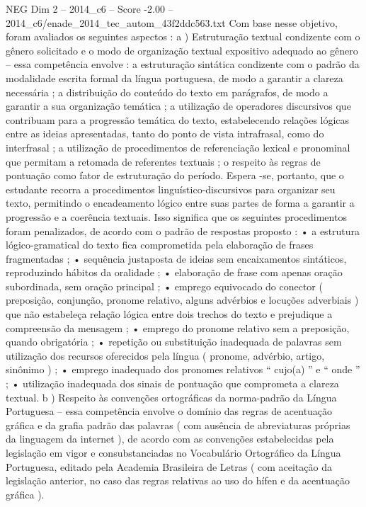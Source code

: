 \begin{textsample}{NEG Dim 2 – 2014\_c6 – Score -2.00 – 2014\_c6/enade\_2014\_tec\_autom\_43f2ddc563.txt}
Com base nesse objetivo, foram avaliados os seguintes aspectos : a ) Estruturação textual condizente com o gênero solicitado e o modo de organização textual expositivo adequado ao gênero – essa competência envolve : a estruturação sintática condizente com o padrão da modalidade escrita formal da língua portuguesa, de modo a garantir a clareza necessária ; a distribuição do conteúdo do texto em parágrafos, de modo a garantir a sua organização temática ; a utilização de operadores discursivos que contribuam para a progressão temática do texto, estabelecendo relações lógicas entre as ideias apresentadas, tanto do ponto de vista intrafrasal, como do interfrasal ; a utilização de procedimentos de referenciação lexical e pronominal que permitam a retomada de referentes textuais ; o respeito às regras de pontuação como fator de estruturação do período.
Espera -se, portanto, que o estudante recorra a procedimentos linguístico-discursivos para organizar seu texto, permitindo o encadeamento lógico entre suas partes de forma a garantir a progressão e a coerência textuais.
Isso significa que os seguintes procedimentos foram penalizados, de acordo com o padrão de respostas proposto : • a estrutura lógico-gramatical do texto fica comprometida pela elaboração de frases fragmentadas ; • sequência justaposta de ideias sem encaixamentos sintáticos, reproduzindo hábitos da oralidade ; • elaboração de frase com apenas oração subordinada, sem oração principal ; • emprego equivocado do conector ( preposição, conjunção, pronome relativo, alguns advérbios e locuções adverbiais ) que não estabeleça relação lógica entre dois trechos do texto e prejudique a compreensão da mensagem ; • emprego do pronome relativo sem a preposição, quando obrigatória ; • repetição ou substituição inadequada de palavras sem utilização dos recursos oferecidos pela língua ( pronome, advérbio, artigo, sinônimo ) ; • emprego inadequado dos pronomes relativos “ cujo(a) ” e “ onde ” ; • utilização inadequada dos sinais de pontuação que comprometa a clareza textual. b ) Respeito às convenções ortográficas da norma-padrão da Língua Portuguesa – essa competência envolve o domínio das regras de acentuação gráfica e da grafia padrão das palavras ( com ausência de abreviaturas próprias da linguagem da internet ), de acordo com as convenções estabelecidas pela legislação em vigor e consubstanciadas no Vocabulário Ortográfico da Língua Portuguesa, editado pela Academia Brasileira de Letras ( com aceitação da legislação anterior, no caso das regras relativas ao uso do hífen e da acentuação gráfica ).

\end{textsample}

